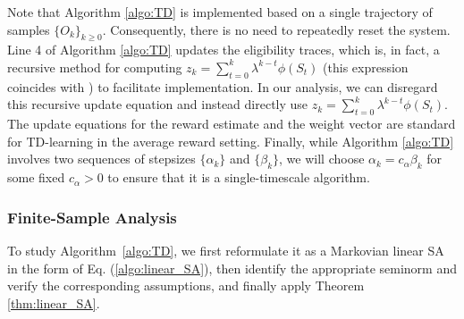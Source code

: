 \documentclass[11 pt]{article}
\begin{document}
	Note that Algorithm \ref{algo:TD} is implemented based on a single trajectory of samples $\{O_k\}_{k \geq 0}$. Consequently, there is no need to repeatedly reset the system. Line 4 of Algorithm \ref{algo:TD} updates the eligibility traces, which is, in fact, a recursive method for computing $z_k = \sum_{t=0}^{k} \lambda^{k-t} \phi(S_t)$ (this expression coincides with \cite[Eq. (4)]{tsitsiklis1999average}) to facilitate implementation. In our analysis, we can disregard this recursive update equation and instead directly use $z_k = \sum_{t=0}^{k} \lambda^{k-t} \phi(S_t)$. The update equations for the reward estimate and the weight vector are standard for TD-learning in the average reward setting. Finally, while Algorithm \ref{algo:TD} involves two sequences of stepsizes $\{\alpha_k\}$ and $\{\beta_k\}$, we will choose $\alpha_k=c_\alpha \beta_k$ for some fixed $c_\alpha > 0$ to ensure that it is a single-timescale algorithm.
	
	\subsubsection{Finite-Sample Analysis}
	To study Algorithm~\ref{algo:TD}, we first reformulate it as a Markovian linear SA in the form of Eq. (\ref{algo:linear_SA}), then identify the appropriate seminorm and verify the corresponding assumptions, and finally apply Theorem \ref{thm:linear_SA}.
	
	
	
\end{document}
